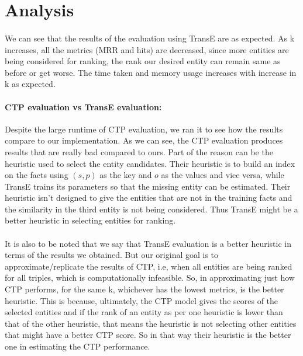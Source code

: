 \documentclass[Other]{iitddiss}
\begin{document}
\section{Analysis}
\paragraph{}
We can see that the results of the evaluation using TransE are as expected. As k increases, all the metrics (MRR and hits) are decreased, since more entities are being considered for ranking, the rank our desired entity can remain same as before or get worse. The time taken and memory usage increases with increase in k as expected. 

\paragraph{CTP evaluation vs TransE evaluation:}
Despite the large runtime of CTP evaluation, we ran it to see how the results compare to our implementation. As we can see, the CTP evaluation produces results that are really bad compared to ours. Part of the reason can be the heuristic used to select the entity candidates. Their heuristic is to build an index on the facts using \((s, p)\) as the key and \(o\) as the values and vice versa, while TransE trains its parameters so that the missing entity can be estimated. Their heuristic isn't designed to give the entities that are not in the training facts and the similarity in the third entity is not being considered. Thus TransE might be a better heuristic in selecting entities for ranking.

\paragraph{}
It is also to be noted that we say that TransE evaluation is a better heuristic in terms of the results we obtained. But our original goal is to approximate/replicate the results of CTP, i.e, when all entities are being ranked for all triples, which is computationally infeasible. So, in approximating just how CTP performs, for the same k, whichever has the lowest metrics, is the better heuristic. This is because, ultimately, the CTP model gives the scores of the selected entities and if the rank of an entity as per one heuristic is lower than that of the other heuristic, that means the heuristic is not selecting other entities that might have a better CTP score. So in that way their heuristic is the better one in estimating the CTP performance.
\end{document}
